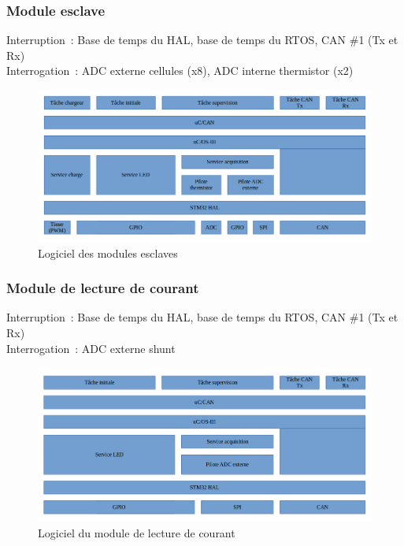 	\subsubsection*{Module esclave}
		\noindent
		Interruption : Base de temps du HAL, base de temps du RTOS, CAN \#1 (Tx et Rx) \\
		Interrogation : ADC externe cellules (x8), ADC interne thermistor (x2)
		\begin{figure}[H]
			\centering
			\includegraphics[scale=0.5]{Images/Logiciel_Slave.png}
			\caption{Logiciel des modules esclaves}
			\label{fig:logiciel_slave}
		\end{figure}
	\subsubsection*{Module de lecture de courant}
		\noindent
		Interruption : Base de temps du HAL, base de temps du RTOS, CAN \#1 (Tx et Rx) \\
		Interrogation : ADC externe shunt
		\begin{figure}[H]
			\centering
			\includegraphics[scale=0.5]{Images/Logiciel_Current_Sense.png}
			\caption{Logiciel du module de lecture de courant}
			\label{fig:logiciel_current_sense}
		\end{figure}
